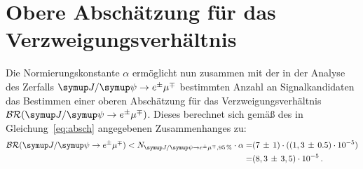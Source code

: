 \section{Obere Abschätzung für das Verzweigungsverhältnis}
Die Normierungskonstante $\alpha$ ermöglicht nun zusammen mit der in der Analyse des Zerfalls $\signal$ bestimmten Anzahl an Signalkandidaten das Bestimmen einer oberen Abschätzung für das Verzweigungsverhältnis $\mathcal{BR}(\signal)$. Dieses berechnet sich gemäß des in Gleichung~\eqref{eq:absch} angegebenen Zusammenhanges zu:
%
\begin{equation}
  \begin{split}
    \mathcal{BR}(\signal)<N_{\signal, \SI{95}{\percent}}\cdot\alpha=& (7\,\pm\,1)\cdot((1,3\,\pm\,0.5)\cdot10^{-5})\\=& (8,3\,\pm\,3,5)\cdot10^{-5} \, .
  \end{split}
\end{equation}
%

\nocite{biblatex, make, toolbox, gitbash, siunitx}
